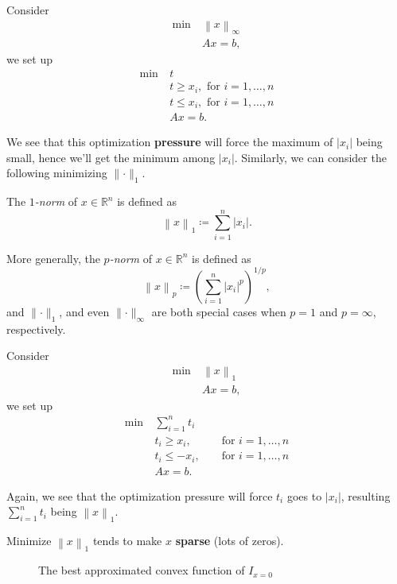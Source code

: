 Consider
\[
	\begin{aligned}
		\min~ & \left\lVert x\right\rVert _{\infty } \\
		      & Ax = b,
	\end{aligned}
\]
we set up
\[
	\begin{aligned}
		\min~ & t                                     \\
		      & t\geq x_i,\text{ for }i = 1, \dots ,n \\
		      & t\leq x_i,\text{ for }i = 1, \dots ,n \\
		      & Ax = b.
	\end{aligned}
\]

We see that this optimization \textbf{pressure} will force the maximum of \(\left\vert x_i \right\vert \) being small, hence we'll get the minimum among \(\left\vert x_i \right\vert \). Similarly, we can consider the following minimizing \(\lVert \cdot \rVert _1\).

\begin{definition}[\(1\)-norm]\label{def:1-norm}
	The \emph{\(1\)-norm} of \(x\in \mathbb{R} ^n\) is defined as
	\[
		\left\lVert x\right\rVert _{1} \coloneqq \sum\limits_{i=1}^{n} \left\vert x_i \right\vert.
	\]
\end{definition}

\begin{note}[\(p\)-norm]
	More generally, the \emph{\(p\)-norm} of \(x\in \mathbb{R} ^n\) is defined as
	\[
		\left\lVert x\right\rVert _{p} \coloneqq \left( \sum\limits_{i=1}^{n} \left\vert x_i \right\vert^p \right)^{1 / p},
	\]
	and \(\lVert \cdot \rVert_1 \), and even \(\lVert \cdot \rVert _{\infty }\) are both special cases when \(p = 1\) and \(p = \infty \), respectively.
\end{note}

Consider
\[
	\begin{aligned}
		\min~ & \left\lVert x\right\rVert _1 \\
		      & Ax = b,
	\end{aligned}
\]
we set up
\[
	\begin{alignedat}{3}
		\min~ & \sum\limits_{i=1}^{n} t_i                \\
		& t_i\geq x_i, && \text{ for }i = 1, \dots ,n  \\
		& t_i\leq -x_i, && \text{ for }i = 1, \dots ,n \\
		& Ax = b.
	\end{alignedat}
\]

Again, we see that the optimization pressure will force \(t_i\) goes to \(\left\vert x_i \right\vert \), resulting \(\sum_{i=1}^{n} t_i\) being \(\left\lVert x\right\rVert _1\).

\begin{remark}
	Minimize \(\left\lVert x\right\rVert _1\) tends to make \(x\) \textbf{sparse} (lots of zeros).
	\begin{figure}[H]
		\centering
		\caption{The best approximated convex function of \(I_{x = 0}\) }
		\label{fig:1-norm}
	\end{figure}
\end{remark}